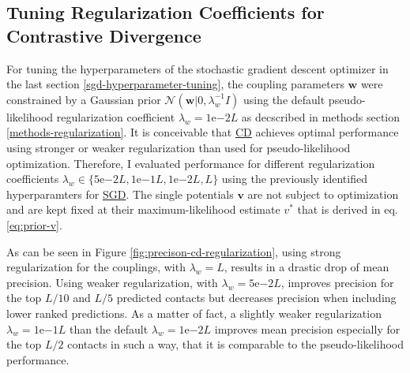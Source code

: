 \documentclass[11pt,a4paper,twoside]{book}
\newcommand{\eq}{\!=\!}
\renewcommand{\v}{\mathbf{v}}
\newcommand{\w}{\mathbf{w}}
\theoremstyle{definition}
\theoremstyle{definition}
\theoremstyle{remark}
\begin{document}
\subsection{Tuning Regularization Coefficients for Contrastive
Divergence}\label{regularization-for-cd-with-sgd}

For tuning the hyperparameters of the stochastic gradient descent
optimizer in the last section \ref{sgd-hyperparameter-tuning}, the
coupling parameters \(\w\) were constrained by a Gaussian prior
\(\mathcal{N}(\w | 0, \lambda_w^{-1} I)\) using the default
pseudo-likelihood regularization coefficient
\(\lambda_w \eq 1\mathrm{e}{-2}L\) as decscribed in methods section
\ref{methods-regularization}. It is conceivable that
\protect\hyperlink{abbrev}{CD} achieves optimal performance using
stronger or weaker regularization than used for pseudo-likelihood
optimization. Therefore, I evaluated performance for different
regularization coefficients
\(\lambda_w \in \{ 5\mathrm{e}{-2}L, 1\mathrm{e}{-1}L, 1\mathrm{e}{-2}L, L\}\)
using the previously identified hyperparamters for
\protect\hyperlink{abbrev}{SGD}. The single potentials \(\v\) are not
subject to optimization and are kept fixed at their maximum-likelihood
estimate \(v^*\) that is derived in eq. \eqref{eq:prior-v}.

As can be seen in Figure \ref{fig:precison-cd-regularization}, using
strong regularization for the couplings, with \(\lambda_w \eq L\),
results in a drastic drop of mean precision. Using weaker
regularization, with \(\lambda_w \eq \mathrm{5e}{-2}L\), improves
precision for the top \(L/10\) and \(L/5\) predicted contacts but
decreases precision when including lower ranked predictions. As a matter
of fact, a slightly weaker regularization
\(\lambda_w \eq \mathrm{1e}{-1}L\) than the default
\(\lambda_w \eq \mathrm{1e}{-2}L\) improves mean precision especially
for the top \(L/2\) contacts in such a way, that it is comparable to the
pseudo-likelihood performance.
\end{document}
